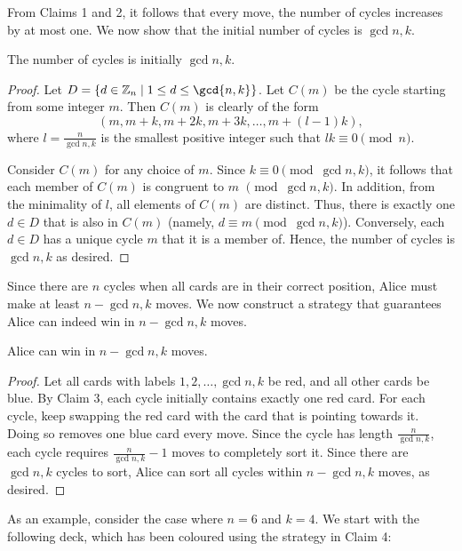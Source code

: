 \begin{solution*}
    From Claims 1 and 2, it follows that every move, the number of cycles increases by at most one. We now show that the initial number of cycles is $\gcd{n, k}$.

    \begin{claim}
        The number of cycles is initially $\gcd{n, k}$.
    \end{claim}
    \begin{proof}
        Let $D = \bc{d \in \ZZ_n \mid 1 \leq d \leq \gcd{n, k}}$. Let $C(m)$ be the cycle starting from some integer $m$. Then $C(m)$ is clearly of the form \[(m, m+k, m+2k, m+3k, \ldots, m+(l-1)k),\] where $l = \frac{n}{\gcd{n, k}}$ is the smallest positive integer such that $lk \equiv 0 \pmod{n}$.

        Consider $C(m)$ for any choice of $m$. Since $k \equiv 0 \pmod{\gcd{n, k}}$, it follows that each member of $C(m)$ is congruent to $m$ $\pmod{\gcd{n, k}}$. In addition, from the minimality of $l$, all elements of $C(m)$ are distinct. Thus, there is exactly one $d \in D$ that is also in $C(m)$ (namely, $d \equiv m \pmod{\gcd{n, k}}$). Conversely, each $d \in D$ has a unique cycle $m$ that it is a member of. Hence, the number of cycles is $\gcd{n, k}$ as desired.
    \end{proof}

    Since there are $n$ cycles when all cards are in their correct position, Alice must make at least $n - \gcd{n, k}$ moves. We now construct a strategy that guarantees Alice can indeed win in $n -\gcd{n, k}$ moves.

    \begin{claim}
        Alice can win in $n - \gcd{n, k}$ moves.
    \end{claim}
    \begin{proof}
        Let all cards with labels $1, 2, \ldots, \gcd{n, k}$ be red, and all other cards be blue. By Claim 3, each cycle initially contains exactly one red card. For each cycle, keep swapping the red card with the card that is pointing towards it. Doing so removes one blue card every move. Since the cycle has length $\frac{n}{\gcd{n, k}}$, each cycle requires $\frac{n}{\gcd{n, k}} - 1$ moves to completely sort it. Since there are $\gcd{n, k}$ cycles to sort, Alice can sort all cycles within $n - \gcd{n, k}$ moves, as desired.
    \end{proof}

    As an example, consider the case where $n = 6$ and $k = 4$. We start with the following deck, which has been coloured using the strategy in Claim 4:


\end{solution*}
